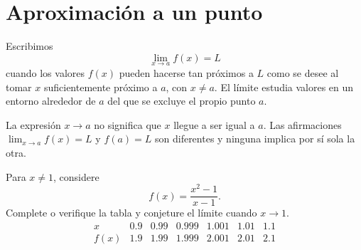 \documentclass[10pt,a5paper]{article}
\newif\ifmostrarSoluciones
\begin{document}
\ifmostrarSoluciones
\begin{solucion}[de los ejercicios]
\begin{enumerate}
  \item Es biyectiva; $f^{-1}(x)=(x-5)/3$.
  \item Su imagen es $[1,\infty)$. Con el codominio declarado $\mathbb{R}$ no es sobreyectiva; tampoco es inyectiva.
  \item Es biyectiva y $h^{-1}(x)=\sqrt{x-1}$.
  \item No: su imagen es $[1,\infty)$, que no coincide con $(0,\infty)$.
  \item $f^{-1}(x)=3x+4$ y las dos composiciones producen $x$.
  \item Por ejemplo, sobre $[2,\infty)$ con codominio $[-1,\infty)$; entonces $r^{-1}(x)=2+\sqrt{x+1}$.
\end{enumerate}
\end{solucion}
\fi
\section*{Aproximación a un punto}

\begin{definicion}
Escribimos
\[
\lim_{x\to a}f(x)=L
\]
cuando los valores $f(x)$ pueden hacerse tan próximos a $L$ como se desee al tomar $x$ suficientemente próximo a $a$, con $x\neq a$. El límite estudia valores en un entorno alrededor de $a$ del que se excluye el propio punto $a$.
\end{definicion}

\begin{nota}
La expresión $x\to a$ no significa que $x$ llegue a ser igual a $a$. Las afirmaciones $\lim_{x\to a}f(x)=L$ y $f(a)=L$ son diferentes y ninguna implica por sí sola la otra.
\end{nota}

\begin{ejemplo}
Para $x\neq1$, considere
\[
f(x)=\frac{x^2-1}{x-1}.
\]
Complete o verifique la tabla y conjeture el límite cuando $x\to1$.
\[
\begin{array}{c|cccccc}
x&0.9&0.99&0.999&1.001&1.01&1.1\\ \hline
f(x)&1.9&1.99&1.999&2.001&2.01&2.1
\end{array}
\]
\end{ejemplo}
\ifmostrarSoluciones
\begin{solucion}
Los valores se aproximan a $2$ desde ambos lados. Como $x^2-1=(x-1)(x+1)$,
\[
f(x)=x+1\quad(x\neq1),
\]
y la evidencia sugiere $\lim_{x\to1}f(x)=2$, aunque $f(1)$ no está definida.
\end{solucion}
\else\vspace{12mm}\fi
\end{document}
